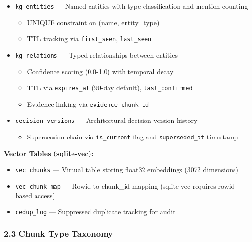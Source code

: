 \documentclass[
]{article}
\providecommand{\tightlist}{%
  \setlength{\itemsep}{0pt}\setlength{\parskip}{0pt}}
\begin{document}
\begin{itemize}
\tightlist
\item
  \texttt{kg\_entities} --- Named entities with type classification and
  mention counting

  \begin{itemize}
  \tightlist
  \item
    UNIQUE constraint on (name, entity\_type)
  \item
    TTL tracking via \texttt{first\_seen}, \texttt{last\_seen}
  \end{itemize}
\item
  \texttt{kg\_relations} --- Typed relationships between entities

  \begin{itemize}
  \tightlist
  \item
    Confidence scoring (0.0-1.0) with temporal decay
  \item
    TTL via \texttt{expires\_at} (90-day default),
    \texttt{last\_confirmed}
  \item
    Evidence linking via \texttt{evidence\_chunk\_id}
  \end{itemize}
\item
  \texttt{decision\_versions} --- Architectural decision version history

  \begin{itemize}
  \tightlist
  \item
    Supersession chain via \texttt{is\_current} flag and
    \texttt{superseded\_at} timestamp
  \end{itemize}
\end{itemize}

\textbf{Vector Tables (sqlite-vec):}

\begin{itemize}
\item
  \texttt{vec\_chunks} --- Virtual table storing float32 embeddings
  (3072 dimensions)
\item
  \texttt{vec\_chunk\_map} --- Rowid-to-chunk\_id mapping (sqlite-vec
  requires rowid-based access)
\item
  \texttt{dedup\_log} --- Suppressed duplicate tracking for audit
\end{itemize}

\subsubsection{2.3 Chunk Type Taxonomy}\label{chunk-type-taxonomy}
\end{document}
